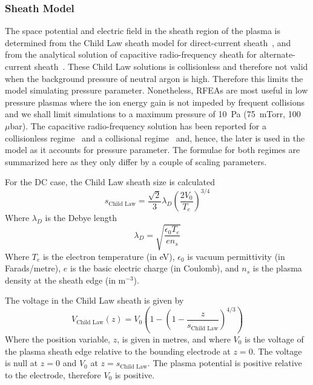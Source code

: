 \subsubsection{\label{SheathModel}Sheath Model}
The space potential and electric field in the sheath region of the plasma is determined from the Child Law sheath model for direct-current sheath~\cite{Lieberman2005}, and from the analytical solution of capacitive radio-frequency sheath for alternate-current sheath~\cite{Lieberman1988,Lieberman1989}. These Child Law solutions is collisionless and therefore not valid when the background pressure of neutral argon is high. Therefore this limits the model simulating pressure parameter. Nonetheless, RFEAs are most useful in low pressure plasmas where the ion energy gain is not impeded by frequent collisions and we shall limit simulations to a maximum pressure of 10~Pa (75~mTorr, 100~$\mu$bar). The capacitive radio-frequency solution has been reported for a collisionless regime~\cite{Lieberman1988} and a collisional regime~\cite{Lieberman1989} and, hence, the later is used in the model as it accounts for pressure parameter. The formulae for both regimes are summarized here as they only differ by a couple of scaling parameters. 

For the DC case, the Child Law sheath size is calculated 
\begin{equation}
s_\text{Child Law} = \frac{\sqrt{2}}{3} \lambda_D \left( \frac{2 V_0}{T_e} \right)^{3/4}
\end{equation}
Where $\lambda_D$ is the Debye length
\begin{equation}
\lambda_D = \sqrt{ \frac{\epsilon_0 T_e}{e n_s} }
\end{equation}
Where $T_e$ is the electron temperature (in eV), $\epsilon_0$ is vacuum permittivity (in Farads/metre), $e$ is the basic electric charge (in Coulomb), and $n_s$ is the plasma density at the sheath edge (in m$^{-3}$).

The voltage in the Child Law sheath is given by
\begin{equation}
V_\text{Child Law}(z) = V_0 \left( 1 -  \left( 1 -\frac{z}{s_\text{Child Law}} \right)^{4/3} \right)
\end{equation}
Where the position variable, $z$, is given in metres, and where $V_0$ is the voltage of the plasma sheath edge relative to the bounding electrode at $z=0$. The voltage is null at $z=0$ and $V_0$ at $z=s_\text{Child Law}$. The plasma potential is positive relative to the electrode, therefore $V_0$ is positive.

